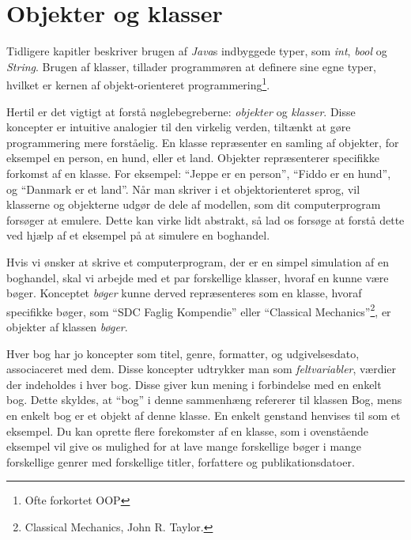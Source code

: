 
\newcommand\sillynote[1]{\footnote{#1}}
\newcommand\importantnote[1]{\begin{remark} #1 \end{remark}}
\newcommand\referencenote[1]{\footnote{#1}}

\chapter{Objekter og klasser}

Tidligere kapitler beskriver brugen af \emph{Java}s indbyggede typer, som
\emph{int}, \emph{bool} og \emph{String}. Brugen af klasser, tillader
programmøren at definere sine egne typer, hvilket er kernen af
objekt-orienteret programmering\sillynote{Ofte forkortet OOP}.

Hertil er det vigtigt at forstå nøglebegreberne: \emph{objekter} og
\emph{klasser}. Disse koncepter er intuitive analogier til den
virkelig verden, tiltænkt at gøre programmering mere forståelig. En
klasse repræsenter en samling af objekter, for eksempel en person, en
hund, eller et land. Objekter repræsenterer specifikke forkomst af en
klasse. For eksempel: ``Jeppe er en person'', ``Fiddo er en hund'', og
``Danmark er et land''.  Når man skriver i et objektorienteret sprog,
vil klasserne og objekterne udgør de dele af modellen, som dit
computerprogram forsøger at emulere. Dette kan virke lidt abstrakt, så
lad os forsøge at forstå dette ved hjælp af et eksempel på at simulere
en boghandel.

\begin{example}
    Hvis vi ønsker at skrive et computerprogram, der er en simpel
    simulation af en boghandel, skal vi arbejde med et par forskellige
    klasser, hvoraf en kunne være bøger. Konceptet \emph{bøger} kunne
    derved repræsenteres som en klasse, hvoraf specifikke bøger, som
    ``SDC Faglig Kompendie'' eller ``Classical
    Mechanics''\referencenote{Classical Mechanics, John R. Taylor.}, er
    objekter af klassen \emph{bøger}.

    Hver bog har jo koncepter som titel, genre, formatter, og
    udgivelsesdato, associaceret med dem. Disse koncepter udtrykker
    man som \emph{feltvariabler}, værdier der indeholdes i hver bog.
    Disse giver kun mening i forbindelse med en enkelt bog. Dette
    skyldes, at ``bog'' i denne sammenhæng refererer til klassen Bog,
    mens en enkelt bog er et objekt af denne klasse.  En enkelt
    genstand henvises til som et eksempel. Du kan oprette flere
    forekomster af en klasse, som i ovenstående eksempel vil give os
    mulighed for at lave mange forskellige bøger i mange forskellige
    genrer med forskellige titler, forfattere og publikationsdatoer.
\end{example}

